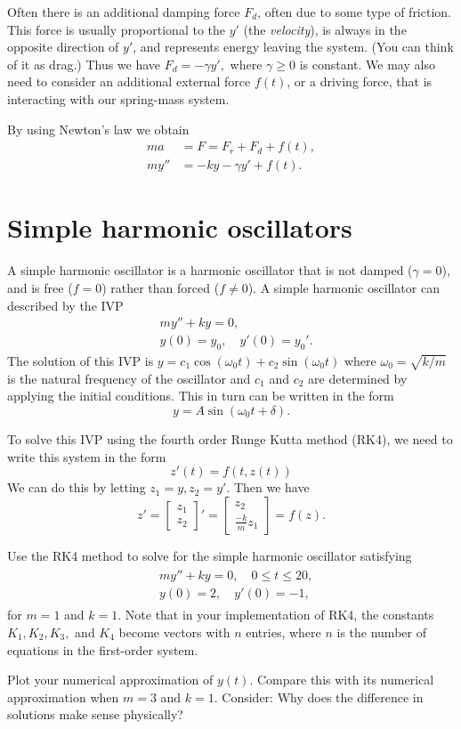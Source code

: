 Often there is an additional damping force $F_d$, often due to some type of friction. 
This force is usually proportional to the $y'$ (the \emph{velocity}), is always in the opposite direction of $y'$, and represents energy leaving the system. (You can think of it as drag.)
Thus we have $F_d = -\gamma y', $ where $ \gamma \geq 0$ is constant.
We may also need to consider an additional external force $f(t)$, or a driving force, that is interacting with our spring-mass system.

By using Newton's law we obtain
\begin{align*}
ma &= F = F_r + F_d + f(t),\\
my'' &= -ky -\gamma y' + f(t).
\end{align*}

\section*{Simple harmonic oscillators}
A simple harmonic oscillator is a harmonic oscillator that is not damped ($\gamma =0$), and is free ($f = 0$) rather than forced ($f \not = 0$). 
A simple harmonic oscillator can described by the IVP
\begin{align*}
&{}my'' + ky = 0,\\
&{}y(0) = y_0,\quad
y'(0) = y_0'.
\end{align*}
The solution of this IVP is $y = c_1\cos (\omega_0 t) + c_2 \sin (\omega_0 t)$ where $\omega_0 = \sqrt{k/m}$ is the natural frequency of the oscillator and $c_1$ and $c_2$ are determined by applying the initial conditions. This in turn can be written in the form
\[y = A\sin (\omega_0 t + \delta) .\]

To solve this IVP using the fourth order Runge Kutta method (RK4), we need to write this system in the form
\[z'(t) = f(t,z(t)) \]
We can do this by letting $z_1 = y, z_2 = y'$. Then we have \[     z'=
 \left[\begin{array}{c}z_1 \\z_2\end{array}\right]'  =  \left[\begin{array}{c}z_2 \\\frac{-k}{m}z_1\end{array}\right]= f(z).\]


\begin{problem} Use the RK4 method to solve for the simple harmonic oscillator satisfying 
\begin{align}
	\begin{split}
&{}my'' + ky = 0,\quad 0 \leq t \leq 20, \\
&{}y(0) = 2, \quad
y'(0) = -1,
	\end{split}
	\label{ivp:simple_oscillator}
\end{align}
for $m = 1$ and $k =1$. Note that in your implementation of RK4, the constants $K_1, K_2, K_3,$ and $K_4$ become vectors with $n$ entries, where $n$ is the number of equations in the first-order system.

Plot your numerical approximation of $y(t)$.  
Compare this with its numerical approximation when $m = 3$ and $k =1$. Consider: Why does the difference in solutions make sense physically?
\end{problem}


